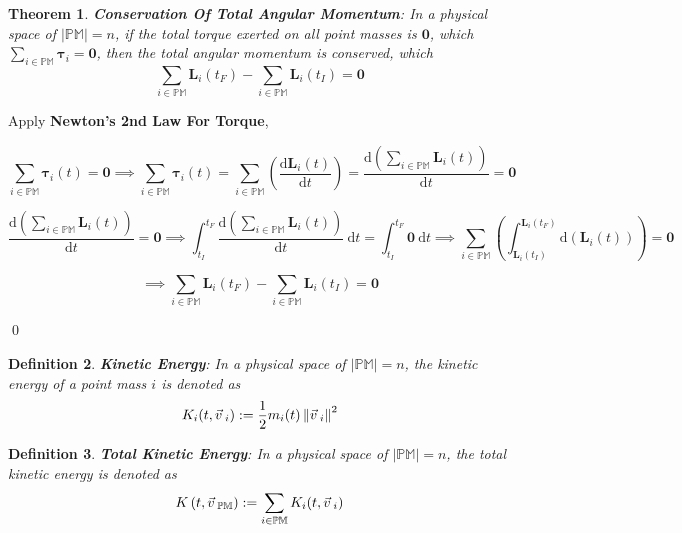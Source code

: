 \documentclass[12pt]{amsart}
\newtheorem{theorem}{Theorem}[section]
\newtheorem{definition}[theorem]{Definition}
\renewenvironment{proof}{{\bfseries Proof.}}{\qed}
\let\oldvec\vec
\renewcommand{\vec}[1]{\oldvec{#1}\hspace{0.1em}}
\begin{document}
\begin{theorem}
\textbf{Conservation Of Total Angular Momentum}: In a physical space of $\left | \mathbb{PM} \right | = n$, if the total torque exerted on all point masses is $\boldsymbol{0}$, which $\displaystyle\sum_{i \in \mathbb{PM}}\boldsymbol{\tau}_{i}=\boldsymbol{0}$, then the total angular momentum is conserved, which $$ \sum_{i \in \mathbb{PM}} \boldsymbol{L}_{i}(t_F)- \sum_{i \in \mathbb{PM}} \boldsymbol{L}_{i}(t_I) = \boldsymbol{0} $$
\end{theorem}

\begin{proof}

Apply \textbf{Newton's 2nd Law For Torque},

$$ \sum_{i \in \mathbb{PM}} \boldsymbol{\tau}_i(t)=\boldsymbol{0} \implies \sum_{i \in \mathbb{PM}} \boldsymbol{\tau}_i(t)= \sum_{i \in \mathbb{PM}} \left(\dfrac{\mathrm{d} \boldsymbol{L}_i(t)}{\mathrm{d} t}\right)= \dfrac{\displaystyle \mathrm{d}\left( \sum_{i \in \mathbb{PM}} \boldsymbol{L}_i(t)\right)}{\mathrm{d} t} =\boldsymbol{0} $$

$$ \dfrac{\displaystyle\mathrm{d}\left( \sum_{i \in \mathbb{PM}} \boldsymbol{L}_i(t)\right)}{\mathrm{d} t}=\boldsymbol{0} \implies \int_{t_I}^{t_F} \dfrac{\displaystyle \mathrm{d}\left( \sum_{i \in \mathbb{PM}} \boldsymbol{L}_i(t)\right)}{\mathrm{d} t} \ \mathrm{d} t = \int_{t_I}^{t_F} \boldsymbol{0} \ \mathrm{d} t \implies \sum_{i \in \mathbb{PM}} \left( \int_{\boldsymbol{L}_{i}(t_I)}^{\boldsymbol{L}_{i}(t_F)} \mathrm{d} \left( \boldsymbol{L}_i (t)\right) \right) = \boldsymbol{0} $$

$$ \implies \sum_{i \in \mathbb{PM}} \boldsymbol{L}_{i}(t_F)- \sum_{i \in \mathbb{PM}} \boldsymbol{L}_{i}(t_I) = \boldsymbol{0} $$

\end{proof}

\begin{definition}
    \textbf{Kinetic Energy}: In a physical space of $\left | \mathbb{PM} \right | = n$, the kinetic energy of a point mass $i$ is denoted as $$ K_i (t, \vec{v}_i) := \dfrac{1}{2} m_i (t) \left \| \vec{v}_i \right \|^2 $$
\end{definition}

\begin{definition}
    \textbf{Total Kinetic Energy}: In a physical space of $\left | \mathbb{PM} \right | = n$, the total kinetic energy is denoted as $$K \left ( t, \vec{v}_\mathbb{PM} \right ) := \sum_{i \in \mathbb{PM}}  K_i(t, \vec{v}_i) $$
\end{definition}
\end{document}
